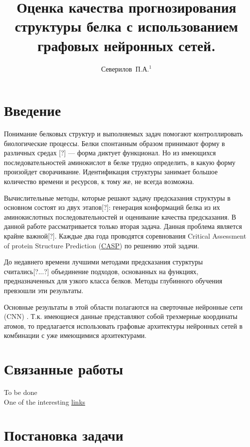 \documentclass[12pt,twosides]{article}
\title
[Качество структуры белка с  графовыми сетями]
{Оценка качества прогнозирования структуры белка с использованием графовых нейронных сетей.}
\author
[Северилов~П.А.] 
{Северилов~П.А.$^1$}
\begin{document}
	\maketitle
	
	\section{Введение}
	
	Понимание белковых структур и выполняемых задач помогают контроллировать биологические процессы. Белки спонтанным образом принимают форму в различных средах [?] — форма диктует функционал. Но из имеющихся последовательностей аминокислот в белке трудно определить, в какую форму произойдет сворачивание. Идентификация структуры занимает большое количество времени и ресурсов, к тому же, не всегда возможна. 
	
	Вычислительные методы, которые решают задачу предсказания структуры в основном состоят из двух этапов[?]: генерация конформаций белка из их аминокислотных последовательностей и оценивание качества предсказания. В данной работе рассматривается только вторая задача. Данная проблема является крайне важной[?]. Каждые два года проводятся соревнования Critical Assessment of protein Structure Prediction (\href{http://predictioncenter.org/}{CASP}) по решению этой задачи.
	
	До недавнего времени лучшими методами предсказания стурктуры считались[?...?] объединение подходов, основанных на функциях, предназначенных для узкого класса белков. Методы глубинного обучения превзошли \cite{AlphaFold} эти результаты.
	
	Основные результаты в этой области полагаются на сверточные нейронные сети (CNN) \cite{10.1093/bioinformatics/btz122}. Т.к. имеющиеся данные представляют собой трехмерные координаты атомов, то предлагается использовать графовые архитектуры нейронных сетей в комбинации с уже имеющимися архитектурами.
	
	
	\section{Связанные работы}
	To be done \\
	One of the interesting \href{https://github.com/jdlc105/Must-read-papers-and-continuous-tracking-on-Graph-Neural-Network-GNN-progress}{links}
	
	
	\section{Постановка задачи}
		
\end{document}
